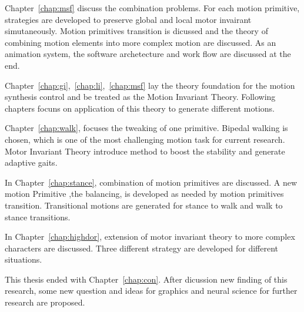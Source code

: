 Chapter~\ref{chap:msf} discuss the combination problems.
For each motion primitive,  strategies are developed to preserve global and local motor invairant simutaneously.
Motion primitives transition is dicussed and the theory of combining motion elements into more complex motion are discussed.
As an animation system, the software archetecture and work flow are discussed at the end.

Chapter~\ref{chap:gi},~\ref{chap:li},~\ref{chap:msf} lay the theory foundation for the motion synthesis control and be treated as the Motion Invariant Theory.
Following chapters focuns on application of this theory to generate different motions.



Chapter~\ref{chap:walk}, focuses the tweaking of one primitive.
Bipedal walking is chosen, which is one of the most challenging motion task for current \cms research.
Motor Invariant Theory introduce method to boost the stability and generate adaptive gaits.


In Chapter~\ref{chap:stance}, combination of motion primitives are discussed.
A new motion Primitive ,the balancing, is developed as needed by  motion primitives transition. 
Transitional motions are generated for stance to walk and walk to stance transitions.

In Chapter~\ref{chap:highdor}, extension of motor invariant theory to more complex characters are discussed.
Three different strategy are developed for different situations.

This thesis ended with Chapter~\ref{chap:con}. 
After dicussion new finding of this research, some new question and ideas for graphics and neural science for further research are proposed.








